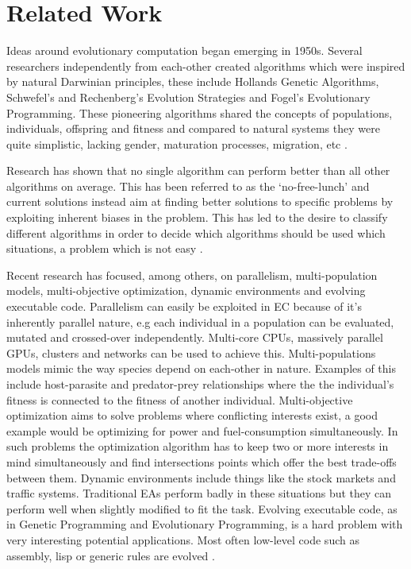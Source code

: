 \section{Related Work}

Ideas around evolutionary computation began emerging in 1950s. Several researchers independently from each-other created algorithms which were inspired by natural Darwinian principles, these include Hollands Genetic Algorithms, Schwefel's and Rechenberg's Evolution Strategies and Fogel's Evolutionary Programming. These pioneering algorithms shared the concepts of populations, individuals, offspring and fitness and compared to natural systems they were quite simplistic, lacking gender, maturation processes, migration, etc \cite{dejong2009EC}.

Research has shown that no single algorithm can perform better than all other algorithms on average. This has been referred to as the `no-free-lunch' and current solutions instead aim at finding better solutions to specific problems by exploiting inherent biases in the problem. This has led to the desire to classify different algorithms in order to decide which algorithms should be used which situations, a problem which is not easy \cite{dejong2009EC}.

Recent research has focused, among others, on parallelism, multi-population models, multi-objective optimization, dynamic environments and evolving executable code. Parallelism can easily be exploited in EC because of it's inherently parallel nature, e.g each individual in a population can be evaluated, mutated and crossed-over independently. Multi-core CPUs, massively parallel GPUs, clusters and networks can be used to achieve this. Multi-populations models mimic the way species depend on each-other in nature. Examples of this include host-parasite and predator-prey relationships where the the individual's fitness is connected to the fitness of another individual. Multi-objective optimization aims to solve problems where conflicting interests exist, a good example would be optimizing for power and fuel-consumption simultaneously. In such problems the optimization algorithm has to keep two or more interests in mind simultaneously and find intersections points which offer the best trade-offs between them. Dynamic environments include things like the stock markets and traffic systems. Traditional EAs perform badly in these situations but they can perform well when slightly modified to fit the task. Evolving executable code, as in Genetic Programming and Evolutionary Programming, is a hard problem with very interesting potential applications. Most often low-level code such as assembly, lisp or generic rules are evolved \cite{dejong2009EC}.




